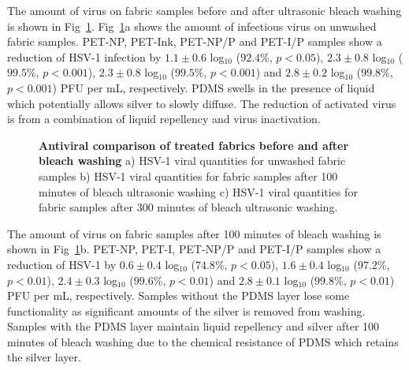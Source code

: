 \documentclass[10pt,letterpaper]{article}
\begin{document}


The amount of virus on fabric samples before and after ultrasonic bleach washing is shown in Fig~\ref{fig5}. Fig~\ref{fig5}a shows the amount of infectious virus on unwashed fabric samples. PET-NP, PET-Ink, PET-NP/P and PET-I/P samples show a reduction of HSV-1 infection by $1.1 \pm 0.6$ log$_{10}$ ($92.4 %
\%$, $p < 0.05$), $2.3 \pm 0.8$ log$_{10}$ ($99.5 %
\%$, $p < 0.001$), $2.3 \pm 0.8$  log$_{10}$ ($99.5 %
\%$, $p < 0.001$) and $2.8 \pm 0.2$ log$_{10}$ ($99.8 %
\%$, $p < 0.001$) PFU per mL, respectively. 
PDMS swells in the presence of liquid which potentially allows silver to slowly diffuse.\cite{bian_2021,faupel:1998,ahmad_2021,dastjerdi:2009}
The reduction of activated virus is from a combination of liquid repellency and virus inactivation.  

\begin{figure}[!h]
\caption{{\bf Antiviral comparison of treated fabrics before and after bleach washing}{
a) HSV-1 viral quantities for unwashed fabric samples b) HSV-1 viral quantities for fabric samples after 100 minutes of bleach ultrasonic washing c) HSV-1 viral quantities for fabric samples after 300 minutes of bleach ultrasonic washing.}}
\label{fig5}
\end{figure}


The amount of virus on fabric samples after 100 minutes of bleach washing is shown in Fig~\ref{fig5}b. PET-NP, PET-I, PET-NP/P and PET-I/P samples show a reduction of HSV-1 by $0.6 \pm 0.4$ log$_{10}$ ($74.8 %
\%$, $p < 0.05$), $1.6 \pm 0.4$ log$_{10}$ ($97.2 %
\%$, $p < 0.01$), $2.4 \pm 0.3$ log$_{10}$ ($99.6 %
\%$, $p < 0.01$) and $2.8 \pm 0.1$ log$_{10}$ ($99.8 %
\%$, $p < 0.01$) PFU per mL,  respectively. Samples without the PDMS layer lose some functionality as significant amounts of the silver is removed from washing. Samples with the PDMS layer maintain liquid repellency and silver after 100 minutes of bleach washing due to the chemical resistance of PDMS which retains the silver layer. 
\end{document}
